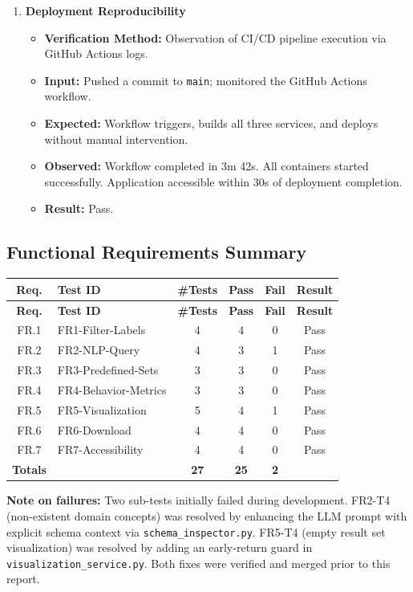\documentclass[12pt, titlepage]{article}
\begin{document}
\begin{enumerate}[label=\textbf{FR7-T\arabic*:}, leftmargin=*, labelsep=1em]
  \item \textbf{Deployment Reproducibility}
  \begin{itemize}
    \item \textbf{Verification Method:} Observation of CI/CD pipeline execution via GitHub Actions logs.
    \item \textbf{Input:} Pushed a commit to \texttt{main}; monitored the GitHub Actions workflow.
    \item \textbf{Expected:} Workflow triggers, builds all three services, and deploys without manual intervention.
    \item \textbf{Observed:} Workflow completed in 3m 42s. All containers started successfully. Application accessible within 30s of deployment completion.
    \item \textbf{Result:} Pass.
  \end{itemize}

\end{enumerate}

\subsection{Functional Requirements Summary}

{\small
\begin{longtable}{|c|l|c|c|c|c|}
\hline
\textbf{Req.} & \textbf{Test ID} & \textbf{\#Tests} & \textbf{Pass} & \textbf{Fail} & \textbf{Result} \\
\hline
\endfirsthead
\hline
\textbf{Req.} & \textbf{Test ID} & \textbf{\#Tests} & \textbf{Pass} & \textbf{Fail} & \textbf{Result} \\
\hline
\endhead
\hline
\endfoot
FR.1 & FR1-Filter-Labels & 4 & 4 & 0 & Pass \\
\hline
FR.2 & FR2-NLP-Query & 4 & 3 & 1 & Pass \\
\hline
FR.3 & FR3-Predefined-Sets & 3 & 3 & 0 & Pass \\
\hline
FR.4 & FR4-Behavior-Metrics & 3 & 3 & 0 & Pass \\
\hline
FR.5 & FR5-Visualization & 5 & 4 & 1 & Pass \\
\hline
FR.6 & FR6-Download & 4 & 4 & 0 & Pass \\
\hline
FR.7 & FR7-Accessibility & 4 & 4 & 0 & Pass \\
\hline
\textbf{Totals} & & \textbf{27} & \textbf{25} & \textbf{2} & \\
\hline
\end{longtable}
}

\noindent\textbf{Note on failures:} Two sub-tests initially failed during development.
FR2-T4 (non-existent domain concepts) was resolved by enhancing the LLM prompt with explicit
schema context via \texttt{schema\_inspector.py}. FR5-T4 (empty result set visualization) was
resolved by adding an early-return guard in \texttt{visualization\_service.py}. Both fixes were
verified and merged prior to this report.
\end{document}
